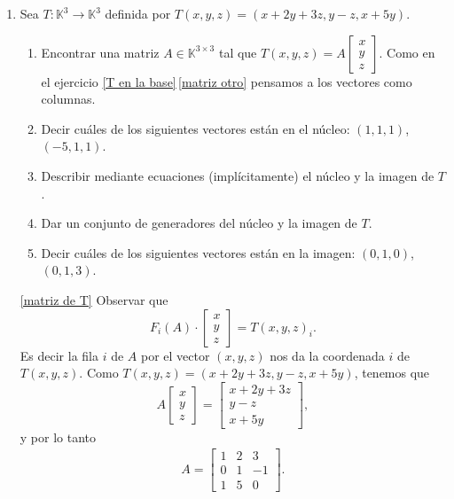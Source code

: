 \begin{enumerate}[topsep=6pt, itemsep=.4cm]
    \item\label{Txyz} Sea $T:\mathbb{K}^3\longrightarrow\mathbb{K}^3$ definida por $T(x,y,z)=(x+2y+3z, y-z,x+5y)$.
        \begin{enumerate}
            \item\label{matriz de T} Encontrar una matriz  $A\in\mathbb{K}^{3\times 3}$ tal que $T(x,y,z)=A\begin{bmatrix}
                    x\\y\\z \end{bmatrix}
                    $.  Como en el ejercicio  \ref{T en la base}\,\ref{matriz otro} pensamos a los vectores como columnas.
            \item\label{Txyz-vectores-nucleo} Decir cuáles de los siguientes vectores están en el núcleo: $(1,1,1)$, $(-5,1,1)$.
            \item\label{Txyz nucleo imagen de T implicito} Describir mediante ecuaciones (implícitamente) el núcleo y la imagen de $T$.
            \item\label{Txyz  nucleo imagen T generadores} Dar un conjunto de generadores del núcleo y la imagen de $T$.
            \item\label{Txyz imagen} Decir cuáles de los siguientes vectores están en la imagen: $(0,1,0)$, $(0,1,3)$.
    \end{enumerate}
    
    \rta

    \ref{matriz de T} Observar  que 
    $$
    F_i(A)\cdot \begin{bmatrix} x\\y\\z \end{bmatrix} = T(x,y,z)_i.
    $$
    Es decir la fila $i$  de $A$ por el vector $(x,y,z)$ nos da la coordenada $i$ de $T(x,y,z)$. Como $T(x,y,z) = (x+2y+3z, y-z,x+5y)$, tenemos que
    $$
    A \begin{bmatrix} x\\y\\z \end{bmatrix} = \begin{bmatrix} x+2y+3z\\ y-z\\x+5y \end{bmatrix},
    $$
    y por lo tanto
    \begin{align*}
        A = \begin{bmatrix}
            1 & 2 & 3 \\
            0 & 1 & -1\\
            1 & 5 & 0
        \end{bmatrix}.  
    \end{align*}


\end{enumerate}
